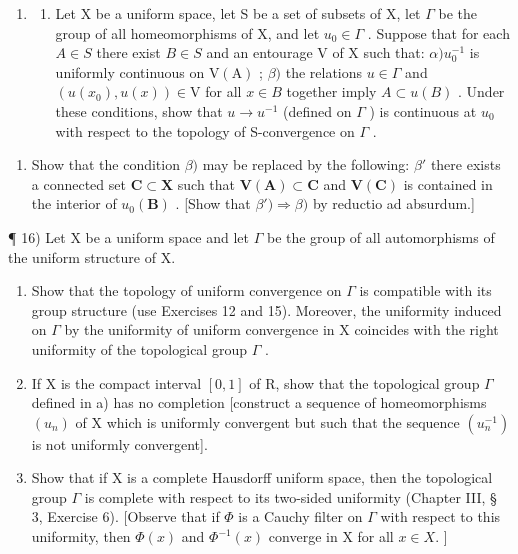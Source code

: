 \begin{enumerate}
\def\labelenumi{\arabic{enumi})}
\setcounter{enumi}{14}
\tightlist
\item
  \begin{enumerate}
  \def\labelenumii{\alph{enumii})}
  \tightlist
  \item
    Let X be a uniform space, let S be a set of subsets of X, let \(\Gamma\) be the group of all homeomorphisms of X, and let \(u_{0} \in \Gamma\) . Suppose that for each \(A \in S\) there exist \(B \in S\) and an entourage V of X such that: \(\alpha) u_{0}^{-1}\) is uniformly continuous on \(\mathrm{V}(\mathrm{A})\) ; \(\beta)\) the relations \(u \in \Gamma\) and \((u(x_{0}), u(x)) \in \mathrm{V}\) for all \(x \in B\) together imply \(A \subset u(B)\) . Under these conditions, show that \(u \to u^{-1}\) (defined on \(\Gamma\) ) is continuous at \(u_{0}\) with respect to the topology of S-convergence on \(\Gamma\) .
  \end{enumerate}
\end{enumerate}

\begin{enumerate}
\def\labelenumi{\alph{enumi})}
\setcounter{enumi}{1}
\tightlist
\item
  Show that the condition \(\beta)\) may be replaced by the following: \(\beta'\) there exists a connected set \(\mathbf{C} \subset \mathbf{X}\) such that \(\mathbf{V}(\mathbf{A}) \subset \mathbf{C}\) and \(\mathbf{V}(\mathbf{C})\) is contained in the interior of \(u_0(\mathbf{B})\) . {[}Show that \(\beta') \Longrightarrow \beta)\) by reductio ad absurdum.{]}
\end{enumerate}

¶ 16) Let X be a uniform space and let \(\Gamma\) be the group of all automorphisms of the uniform structure of X.

\begin{enumerate}
\def\labelenumi{\alph{enumi})}
\item
  Show that the topology of uniform convergence on \(\Gamma\) is compatible with its group structure (use Exercises 12 and 15). Moreover, the uniformity induced on \(\Gamma\) by the uniformity of uniform convergence in X coincides with the right uniformity of the topological group \(\Gamma\) .
\item
  If X is the compact interval \([0, 1]\) of R, show that the topological group \(\Gamma\) defined in a) has no completion {[}construct a sequence of homeomorphisms \((u_{n})\) of X which is uniformly convergent but such that the sequence \((u_{n}^{-1})\) is not uniformly convergent{]}.
\item
  Show that if X is a complete Hausdorff uniform space, then the topological group \(\Gamma\) is complete with respect to its two-sided uniformity (Chapter III, § 3, Exercise 6). {[}Observe that if \(\Phi\) is a Cauchy filter on \(\Gamma\) with respect to this uniformity, then \(\Phi(x)\) and \(\Phi^{-1}(x)\) converge in X for all \(x \in X.\) {]}
\end{enumerate}

